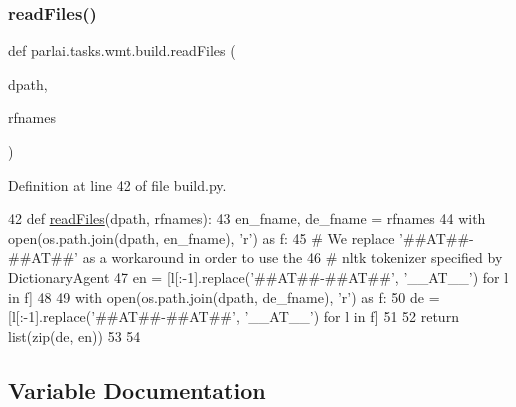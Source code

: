\mbox{\label{namespaceparlai_1_1tasks_1_1wmt_1_1build_a192eab3c7b1241809a1c134d54a9933f}} 
\subsubsection{\texorpdfstring{read\+Files()}{readFiles()}}
{\footnotesize\ttfamily def parlai.\+tasks.\+wmt.\+build.\+read\+Files (\begin{DoxyParamCaption}\item[{}]{dpath,  }\item[{}]{rfnames }\end{DoxyParamCaption})}



Definition at line 42 of file build.\+py.


\begin{DoxyCode}
42 \textcolor{keyword}{def }\hyperlink{namespaceparlai_1_1tasks_1_1wmt_1_1build_a192eab3c7b1241809a1c134d54a9933f}{readFiles}(dpath, rfnames):
43     en\_fname, de\_fname = rfnames
44     with open(os.path.join(dpath, en\_fname), \textcolor{stringliteral}{'r') as f:}
45 \textcolor{stringliteral}{        }\textcolor{comment}{# We replace '##AT##-##AT##' as a workaround in order to use the}
46         \textcolor{comment}{# nltk tokenizer specified by DictionaryAgent}
47         en = [l[:-1].replace(\textcolor{stringliteral}{'##AT##-##AT##'}, \textcolor{stringliteral}{'\_\_AT\_\_'}) \textcolor{keywordflow}{for} l \textcolor{keywordflow}{in} f]
48 
49     with open(os.path.join(dpath, de\_fname), \textcolor{stringliteral}{'r') as f:}
50 \textcolor{stringliteral}{        de = [l[:-1].replace('##AT##-##AT##'}, \textcolor{stringliteral}{'\_\_AT\_\_'}) \textcolor{keywordflow}{for} l \textcolor{keywordflow}{in} f]
51 
52     \textcolor{keywordflow}{return} list(zip(de, en))
53 
54 
\end{DoxyCode}


\subsection{Variable Documentation}
\mbox{\label{namespaceparlai_1_1tasks_1_1wmt_1_1build_a1d3c055b42a6d2afdc77be3068414bae}} 
